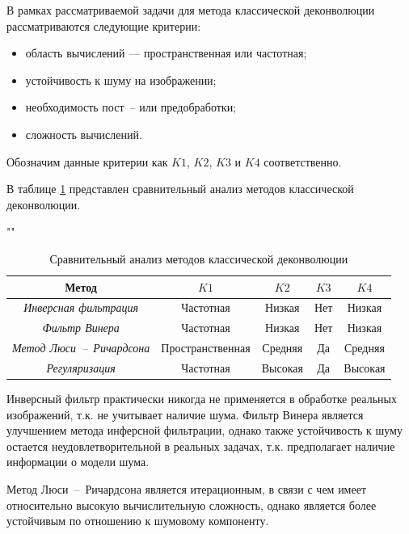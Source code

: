 В рамках рассматриваемой задачи для метода классической деконволюции рассматриваются следующие критерии:

\begin{itemize}
	\item область вычислений --- пространственная или частотная;
	\item устойчивость к шуму на изображении;
	\item необходимость пост~-- или предобработки;
	\item сложность вычислений.
\end{itemize}

Обозначим данные критерии как $K1$, $K2$, $K3$ и $K4$ соответственно.

В таблице \ref{analys} представлен сравнительный анализ методов классической деконволюции.

\renewcommand{\arraystretch}{2}
\begin{table}[h!]
	\begin{center}
		\caption{Сравнительный анализ методов классической деконволюции}
		""\newline
		\label{analys}
		\begin{tabular}{ |c|c|c|c|c| } 
			\hline
			\textbf{Метод} & \textbf{$K1$} & \textbf{$K2$}& \textbf{$K3$}& \textbf{$K4$}\\
			\hline
			\textit{Инверсная фильтрация} & Частотная & Низкая & Нет & Низкая\\
			\hline
			\textit{Фильтр Винера} & Частотная & Низкая & Нет & Низкая\\
			\hline
			\textit{Метод Люси~--~Ричардсона} & Пространственная & Средняя & Да & Средняя\\
			\hline
			\textit{Регуляризация} & Частотная & Высокая & Да & Высокая\\
			\hline
		\end{tabular}
	\end{center}
\end{table}

Инверсный фильтр практически никогда не применяется в обработке реальных изображений, т.к. не учитывает наличие шума. Фильтр Винера является улучшением метода инферсной фильтрации, однако также устойчивость к шуму остается неудовлетворительной в реальных задачах, т.к. предполагает наличие информации о модели шума.

Метод Люси~--~Ричардсона является итерационным, в связи с чем имеет относительно высокую вычислительную сложность, однако является более устойчивым по отношению к шумовому компоненту.

